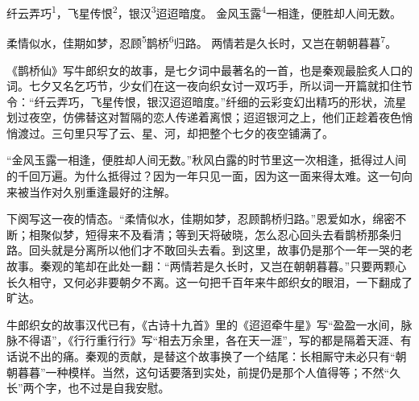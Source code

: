 
\begin{poem}
纤云弄巧\textsuperscript{1}，飞星传恨\textsuperscript{2}，银汉\textsuperscript{3}迢迢暗度。
金风玉露\textsuperscript{4}一相逢，便胜却人间无数。

柔情似水，佳期如梦，忍顾\textsuperscript{5}鹊桥\textsuperscript{6}归路。
两情若是久长时，又岂在朝朝暮暮\textsuperscript{7}。
\end{poem}

\begin{annotations}
\end{annotations}

\begin{appreciation}
《鹊桥仙》写牛郎织女的故事，是七夕词中最著名的一首，也是秦观最脍炙人口的词。七夕又名乞巧节，少女们在这一夜向织女讨一双巧手，所以词一开篇就扣住节令：“纤云弄巧，飞星传恨，银汉迢迢暗度。”纤细的云彩变幻出精巧的形状，流星划过夜空，仿佛替这对暂隔的恋人传递着离恨；迢迢银河之上，他们正趁着夜色悄悄渡过。三句里只写了云、星、河，却把整个七夕的夜空铺满了。

“金风玉露一相逢，便胜却人间无数。”秋风白露的时节里这一次相逢，抵得过人间的千回万遍。为什么抵得过？因为一年只见一面，因为这一面来得太难。这一句向来被当作对久别重逢最好的注解。

下阕写这一夜的情态。“柔情似水，佳期如梦，忍顾鹊桥归路。”恩爱如水，绵密不断；相聚似梦，短得来不及看清；等到天将破晓，怎么忍心回头去看鹊桥那条归路。回头就是分离所以他们才不敢回头去看。到这里，故事仍是那个一年一哭的老故事。秦观的笔却在此处一翻：“两情若是久长时，又岂在朝朝暮暮。”只要两颗心长久相守，又何必非要朝夕不离。这一句把千百年来牛郎织女的眼泪，一下翻成了旷达。

牛郎织女的故事汉代已有，《古诗十九首》里的《迢迢牵牛星》写“盈盈一水间，脉脉不得语”，《行行重行行》写“相去万余里，各在天一涯”，写的都是隔着天涯、有话说不出的痛。秦观的贡献，是替这个故事换了一个结尾：长相厮守未必只有“朝朝暮暮”一种模样。当然，这句话要落到实处，前提仍是那个人值得等；不然“久长”两个字，也不过是自我安慰。
\end{appreciation}
